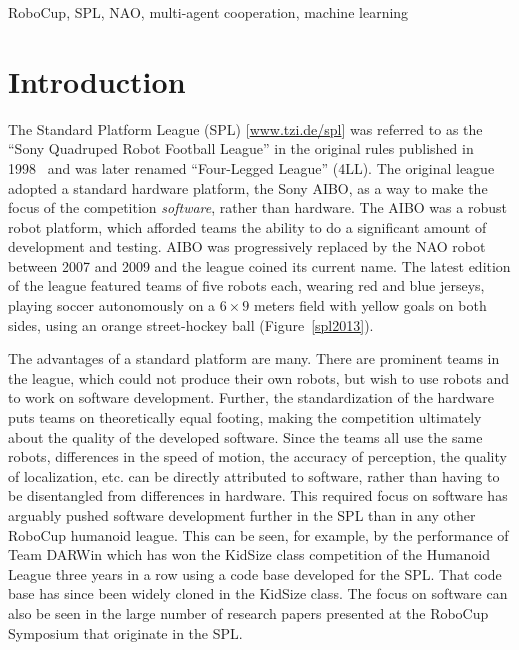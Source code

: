 \documentclass{llncs}
\begin{document}
\begin{keywords}
RoboCup, SPL, NAO, multi-agent cooperation, machine learning
\end{keywords}

\section{Introduction}

The Standard Platform League (SPL) [\url{www.tzi.de/spl}] was referred to as the ``Sony Quadruped Robot Football League''
in the original rules published %
in 1998~\cite{rules1998} and was later renamed ``Four-Legged League'' (4LL).
The original league adopted a standard hardware platform, the Sony AIBO, as a way to make the focus
of the competition \textit{software}, rather than hardware. The AIBO was a 
robust robot platform, which afforded teams the ability to do a significant amount of development
and testing. 
AIBO was progressively replaced by the NAO robot between 2007 and 2009 and the league coined its current name. The latest edition of the league featured teams of five robots each, wearing red and blue jerseys, playing soccer autonomously on a $6\times9$ meters field with yellow goals on both sides, using an orange street-hockey ball (Figure~\ref{spl2013}).

The advantages of a standard platform are many. There are prominent teams
in the league, which could not produce their own robots, but wish to use
robots and to work on software development. Further, the
standardization of the hardware puts teams on theoretically equal footing, making the
competition ultimately about the quality of the developed software. Since the teams all use the
same robots, differences in the speed of motion, the accuracy of perception, the quality of localization, etc. can
be directly attributed to software, rather than having to be disentangled from differences
in hardware.
This required focus on software
has arguably pushed software development further in the SPL than in any other RoboCup humanoid league. This can be seen, for example, by the performance of Team DARWin which has won the KidSize
class competition of the Humanoid League three years in a row using a code base developed for the SPL. That code base
has since been widely cloned in the KidSize class. The focus on software can also be
seen in the large number of research papers presented at the RoboCup Symposium that originate in the
SPL.
\end{document}
